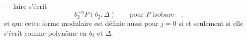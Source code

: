 -  -
laire s'écrit
\[
b_2^{-n}P(b_2,\Delta)\qquad\text{pour }P\text{ isobare}\quad,
\]
et que cette forme modulaire est définie aussi pour $j=0$ si et seulement si elle s'écrit comme polynôme en $b_2$ et $\Delta$.
